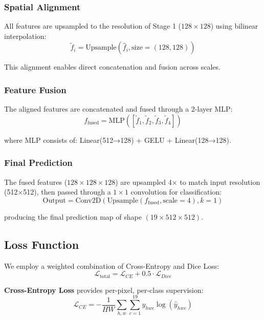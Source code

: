\subsubsection{Spatial Alignment}

All features are upsampled to the resolution of Stage 1 ($128 \times 128$) using bilinear interpolation:
\begin{equation}
\tilde{f}_i = \text{Upsample}(\hat{f}_i, \text{size}=(128, 128))
\end{equation}

This alignment enables direct concatenation and fusion across scales.

\subsubsection{Feature Fusion}

The aligned features are concatenated and fused through a 2-layer MLP:
\begin{equation}
f_{\text{fused}} = \text{MLP}([\tilde{f}_1, \tilde{f}_2, \tilde{f}_3, \tilde{f}_4])
\end{equation}

where MLP consists of: Linear(512→128) + GELU + Linear(128→128).

\subsubsection{Final Prediction}

The fused features ($128 \times 128 \times 128$) are upsampled 4× to match input resolution (512×512), then passed through a $1\times1$ convolution for classification:
\begin{equation}
\text{Output} = \text{Conv2D}(\text{Upsample}(f_{\text{fused}}, \text{scale}=4), k=1)
\end{equation}

producing the final prediction map of shape $(19 \times 512 \times 512)$.

\subsection{Loss Function}

We employ a weighted combination of Cross-Entropy and Dice Loss:
\begin{equation}
\mathcal{L}_{\text{total}} = \mathcal{L}_{CE} + 0.5 \cdot \mathcal{L}_{Dice}
\end{equation}

\textbf{Cross-Entropy Loss} provides per-pixel, per-class supervision:
\begin{equation}
\mathcal{L}_{CE} = -\frac{1}{HW}\sum_{h,w}\sum_{c=1}^{19} y_{hwc} \log(\hat{y}_{hwc})
\end{equation}

